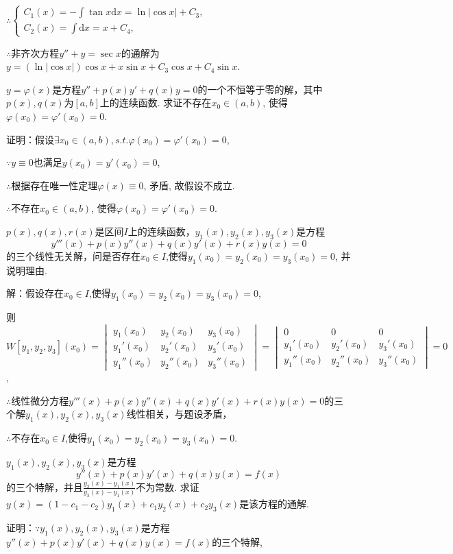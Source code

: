 \documentclass[12pt,UTF8]{ctexart}
\newcommand{\md}[1]{\mathrm d#1}
\begin{document}
\begin{enumerate}
$\therefore\begin{cases}
C_1(x)=-\int\tan x\md x=\ln|\cos x|+C_3,\\
C_2(x)=\int\md x=x+C_4,
\end{cases}$

$\therefore$非齐次方程$y''+y=\sec x$的通解为$y=(\ln|\cos x|)\cos x+x\sin x+C_3\cos x+C_4\sin x$.

$y=\varphi(x)$是方程$y''+p(x)y'+q(x)y=0$的一个不恒等于零的解，其中$p(x),q(x)$为$[a,b]$上的连续函数. 求证不存在$x_0\in(a,b)$, 使得$\varphi(x_0)=\varphi'(x_0)=0$.

证明：假设$\exists x_0\in(a,b),s.t.\varphi(x_0)=\varphi'(x_0)=0$,

$\because y\equiv0$也满足$y(x_0)=y'(x_0)=0$,

$\therefore$根据存在唯一性定理$\varphi(x)\equiv0$, 矛盾, 故假设不成立.

$\therefore$不存在$x_0\in(a,b)$, 使得$\varphi(x_0)=\varphi'(x_0)=0$.

$p(x),q(x),r(x)$是区间$I$上的连续函数，$y_1(x),y_2(x),y_3(x)$是方程\[y'''(x)+p(x)y''(x)+q(x)y'(x)+r(x)y(x)=0\]的三个线性无关解，问是否存在$x_0\in I$,使得$y_1(x_0)=y_2(x_0)=y_3(x_0)=0$, 并说明理由.

解：假设存在$x_0\in I$,使得$y_1(x_0)=y_2(x_0)=y_3(x_0)=0$,

则$W[y_1,y_2,y_3](x_0)=\begin{vmatrix}y_1(x_0)&y_2(x_0)&y_3(x_0)\\ y_1'(x_0)&y_2'(x_0)&y_3'(x_0)\\y_1''(x_0)&y_2''(x_0)&y_3''(x_0)\end{vmatrix}=\begin{vmatrix}0&0&0\\ y_1'(x_0)&y_2'(x_0)&y_3'(x_0)\\y_1''(x_0)&y_2''(x_0)&y_3''(x_0)\end{vmatrix}=0$,

$\therefore$线性微分方程$y'''(x)+p(x)y''(x)+q(x)y'(x)+r(x)y(x)=0$的三个解$y_1(x),y_2(x),y_3(x)$线性相关，与题设矛盾，

$\therefore$不存在$x_0\in I$,使得$y_1(x_0)=y_2(x_0)=y_3(x_0)=0$.

$y_1(x),y_2(x),y_3(x)$是方程\[y''(x)+p(x)y'(x)+q(x)y(x)=f(x)\]的三个特解，并且$\frac{y_2(x)-y_1(x)}{y_3(x)-y_1(x)}$不为常数. 求证$y(x)=(1-c_1-c_2)y_1(x)+c_1y_2(x)+c_2y_3(x)$是该方程的通解.

证明：$\because y_1(x),y_2(x),y_3(x)$是方程$y''(x)+p(x)y'(x)+q(x)y(x)=f(x)$的三个特解,


\end{enumerate}
\end{document}

